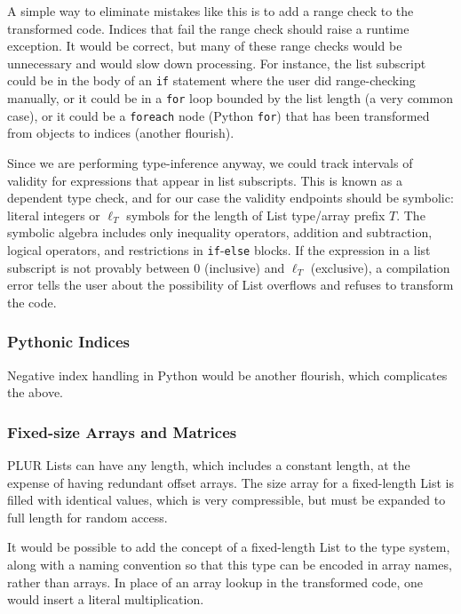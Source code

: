 \documentclass[10pt, conference, compsocconf]{IEEEtran}
\begin{document}
A simple way to eliminate mistakes like this is to add a range check to the transformed code. Indices that fail the range check should raise a runtime exception. It would be correct, but many of these range checks would be unnecessary and would slow down processing. For instance, the list subscript could be in the body of an {\tt if} statement where the user did range-checking manually, or it could be in a {\tt for} loop bounded by the list length (a very common case), or it could be a {\tt foreach} node (Python {\tt for}) that has been transformed from objects to indices (another flourish).

Since we are performing type-inference anyway, we could track intervals of validity for expressions that appear in list subscripts. This is known as a dependent type check, and for our case the validity endpoints should be symbolic: literal integers or $\ell_T$ symbols for the length of List type/array prefix $T$. The symbolic algebra includes only inequality operators, addition and subtraction, logical operators, and restrictions in {\tt if}-{\tt else} blocks. If the expression in a list subscript is not provably between 0 (inclusive) and $\ell_T$ (exclusive), a compilation error tells the user about the possibility of List overflows and refuses to transform the code.

\subsubsection{Pythonic Indices}

Negative index handling in Python would be another flourish, which complicates the above.

\subsubsection{Fixed-size Arrays and Matrices}

PLUR Lists can have any length, which includes a constant length, at the expense of having redundant offset arrays. The size array for a fixed-length List is filled with identical values, which is very compressible, but must be expanded to full length for random access.

It would be possible to add the concept of a fixed-length List to the type system, along with a naming convention so that this type can be encoded in array names, rather than arrays. In place of an array lookup in the transformed code, one would insert a literal multiplication.
\end{document}

